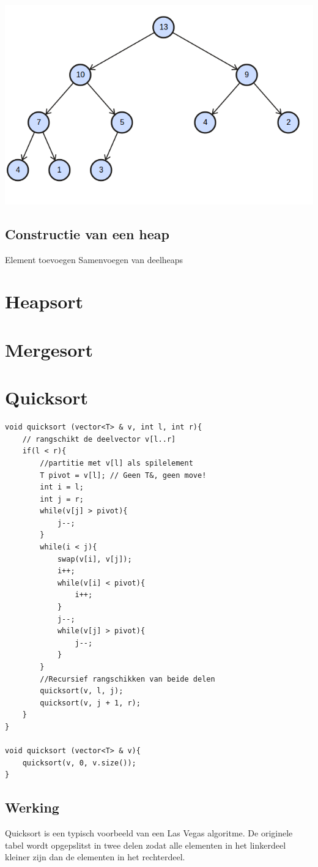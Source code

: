 \documentclass[12pt]{report}
\begin{document}
\includegraphics[width=\textwidth]{heap_4}

\subsection{Constructie van een heap}
Element toevoegen
Samenvoegen van deelheaps

\section{Heapsort}
\section{Mergesort}
\section{Quicksort}
\begin{lstlisting}
void quicksort (vector<T> & v, int l, int r){
    // rangschikt de deelvector v[l..r]
    if(l < r){
        //partitie met v[l] als spilelement
        T pivot = v[l]; // Geen T&, geen move!
        int i = l;
        int j = r;
        while(v[j] > pivot){
            j--;
        }
        while(i < j){
            swap(v[i], v[j]);
            i++;
            while(v[i] < pivot){
                i++;
            }
            j--;
            while(v[j] > pivot){
                j--;
            }
        }
        //Recursief rangschikken van beide delen
        quicksort(v, l, j);
        quicksort(v, j + 1, r);
    }
}

void quicksort (vector<T> & v){
    quicksort(v, 0, v.size());
}
\end{lstlisting}
\subsection{Werking}
Quicksort is een typisch voorbeeld van een Las Vegas algoritme. De originele tabel wordt opgepslitst in twee delen zodat alle elementen in het linkerdeel kleiner zijn dan de elementen in het rechterdeel.
\end{document}
